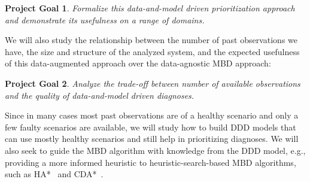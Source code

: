 \documentclass[12pt]{article}
\newtheorem{problem}{Project Goal}
\begin{document}


 



\begin{problem}
Formalize this data-and-model driven prioritization approach and demonstrate its usefulness on a range of domains. 
\end{problem}
We will also study the relationship between the number of past observations we have, the size and structure of the analyzed system, and the expected usefulness of this data-augmented approach over the data-agnostic MBD approach: 
\begin{problem}
Analyze the trade-off between number of available observations and the quality of data-and-model driven diagnoses.
\end{problem}
Since in many cases most past observations are of a healthy scenario and only a few faulty scenarios are available, we will study how to build DDD models that can use mostly healthy scenarios and still help in prioritizing diagnoses. We will also seek to guide the MBD algorithm with knowledge from the DDD model, e.g., providing a more informed heuristic to heuristic-search-based MBD algorithms, such as HA*~\cite{feldman2006two} and CDA*~\cite{williams2007conflict}. %
\end{document}
